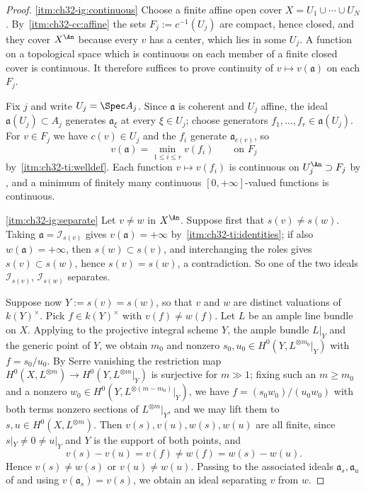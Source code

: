 \begin{proof}
\cref{itm:ch32-ig:continuous}  Choose a finite affine open cover
$X=U_1\cup\cdots\cup U_N$.  By
\,\cref{itm:ch32-cc:affine} the sets
$F_j:=c^{-1}(U_j)$ are compact, hence closed, and they cover $X^{\An}$
because every $v$ has a center, which lies in some $U_j$.  A function on
a topological space which is continuous on each member of a finite closed
cover is continuous.  It therefore suffices to prove continuity of
$v\mapsto v(\mathfrak a)$ on each $F_j$.

Fix $j$ and write $U_j=\Spec A_j$.  Since $\mathfrak a$ is coherent and
$U_j$ affine, the ideal $\mathfrak a(U_j)\subset A_j$ generates
$\mathfrak a_\xi$ at every $\xi\in U_j$; choose generators
$f_1,\ldots,f_r\in\mathfrak a(U_j)$.  For $v\in F_j$ we have
$c(v)\in U_j$ and the $f_i$ generate $\mathfrak a_{c(v)}$, so
\[
 v(\mathfrak a)=\min_{1\leq i\leq r}v(f_i)
 \qquad\text{on }F_j
\]
by \,\cref{itm:ch32-ti:welldef}.  Each
function $v\mapsto v(f_i)$ is continuous on $U_j^{\An}\supset F_j$ by
, and a minimum of finitely many continuous
$[0,+\infty]$-valued functions is continuous.

\cref{itm:ch32-ig:separate}  Let $v\neq w$ in $X^{\An}$.  Suppose first
that $s(v)\neq s(w)$.  Taking $\mathfrak a=\mathcal I_{s(v)}$ gives
$v(\mathfrak a)=+\infty$ by
\,\cref{itm:ch32-ti:identities}; if also
$w(\mathfrak a)=+\infty$, then $s(w)\subset s(v)$, and interchanging the
roles gives $s(v)\subset s(w)$, hence $s(v)=s(w)$, a contradiction.  So
one of the two ideals $\mathcal I_{s(v)}$, $\mathcal I_{s(w)}$
separates.

Suppose now $Y:=s(v)=s(w)$, so that $v$ and $w$ are distinct
valuations of $k(Y)^\times$.  Pick $f\in k(Y)^\times$ with
$v(f)\neq w(f)$.  Let $L$ be an ample line bundle on $X$.  Applying
 to the projective integral
scheme $Y$, the ample bundle $L|_Y$ and the generic point of $Y$, we
obtain $m_0$ and nonzero
$s_0,u_0\in H^0(Y,L^{\otimes m_0}|_Y)$ with $f=s_0/u_0$.  By Serre
vanishing the restriction map
$H^0(X,L^{\otimes m})\to H^0(Y,L^{\otimes m}|_Y)$ is surjective for
$m\gg1$; fixing such an $m\geq m_0$ and a nonzero
$w_0\in H^0(Y,L^{\otimes(m-m_0)}|_Y)$, we have
$f=(s_0w_0)/(u_0w_0)$ with both terms nonzero sections of
$L^{\otimes m}|_Y$, and we may lift them to
$s,u\in H^0(X,L^{\otimes m})$.  Then
$v(s),v(u),w(s),w(u)$ are all finite, since $s|_Y\neq0\neq u|_Y$ and
$Y$ is the support of both points, and
\[
 v(s)-v(u)=v(f)\neq w(f)=w(s)-w(u).
\]
Hence $v(s)\neq w(s)$ or $v(u)\neq w(u)$.  Passing to the associated
ideals $\mathfrak a_s,\mathfrak a_u$ of
 and using $v(\mathfrak a_s)=v(s)$, we obtain an
ideal separating $v$ from $w$.


\end{proof}
